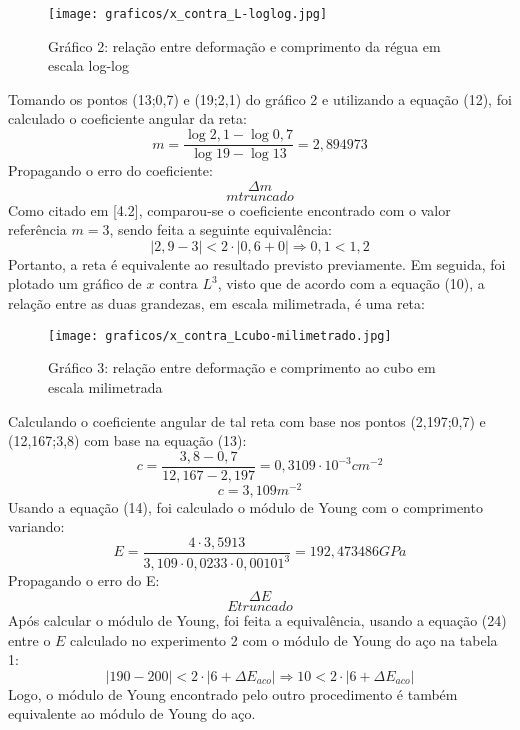 \documentclass{article}
\begin{document}
\begin{figure}[!h]
    \centering
    \caption{Gráfico 2: relação entre deformação e comprimento da régua em escala log-log}
    \texttt{[image: graficos/x\_contra\_L-loglog.jpg]}
    \label{fig:enter-label}
\end{figure}
Tomando os pontos (13;0,7) e (19;2,1) do gráfico 2 e utilizando a equação (12), foi calculado o coeficiente angular da reta:
\begin{equation}
    m = \frac{\log 2,1 - \log 0,7}{\log 19 - \log 13} = 2,894973
\end{equation}
Propagando o erro do coeficiente: 
\begin{equation}
    \Delta m
\end{equation}
\begin{equation}
    m truncado
\end{equation}
Como citado em [4.2], comparou-se o coeficiente encontrado com o valor referência $m = 3$, sendo feita a seguinte equivalência:
\begin{equation}
    |2,9 - 3| < 2\cdot|0,6 + 0| \Rightarrow 0,1 < 1,2
\end{equation}
Portanto, a reta é equivalente ao resultado previsto previamente.
Em seguida, foi plotado um gráfico de $x$ contra $L^3$, visto que de acordo com a equação (10), a relação entre as duas grandezas, em escala milimetrada, é uma reta:
\begin{figure}[!h]
    \centering
    \caption{Gráfico 3: relação entre deformação e comprimento ao cubo em escala milimetrada}
    \texttt{[image: graficos/x\_contra\_Lcubo-milimetrado.jpg]}
    \label{fig:enter-label}
\end{figure}
Calculando o coeficiente angular de tal reta com base nos pontos (2,197;0,7) e (12,167;3,8) com base na equação (13):
\begin{equation}
    c = \frac{3,8 - 0,7}{12,167 - 2,197} = 0,3109\cdot 10^{-3} cm^{-2}
\end{equation}
\[
    c = 3,109 m^{-2}
\]
Usando a equação (14), foi calculado o módulo de Young com o comprimento variando:
\begin{equation}
    E = \frac{4\cdot 3,5913}{3,109\cdot 0,0233\cdot 0,00101^{3}} = 192,473486 GPa
\end{equation}
Propagando o erro do E: 
\begin{equation}
    \Delta E
\end{equation}
\begin{equation}
    E truncado
\end{equation}
Após calcular o módulo de Young, foi feita a equivalência, usando a equação (24) entre o $E$ calculado no experimento 2 com o módulo de Young do aço na tabela 1:
\[
    |190 - 200| < 2\cdot |6 + \Delta E_{aco}| \Rightarrow 10 < 2\cdot|6 + \Delta E_{aco}|
\]
Logo, o módulo de Young encontrado pelo outro procedimento é também equivalente ao módulo de Young do aço.
    
\end{document}
